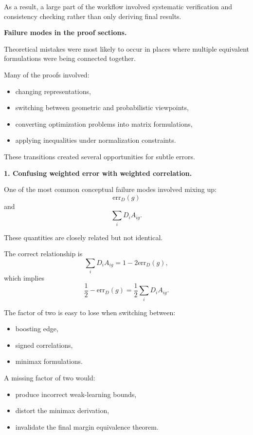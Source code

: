 \documentclass[11pt]{article}
\begin{document}
\begin{enumerate}
\begin{solutionbox}
As a result, a large part of the workflow involved systematic verification and consistency checking rather than only deriving final results.

\medskip

\textbf{Failure modes in the proof sections.}

Theoretical mistakes were most likely to occur in places where multiple equivalent formulations were being connected together.

Many of the proofs involved:
\begin{itemize}
    \item changing representations,
    \item switching between geometric and probabilistic viewpoints,
    \item converting optimization problems into matrix formulations,
    \item applying inequalities under normalization constraints.
\end{itemize}

These transitions created several opportunities for subtle errors.

\bigskip

\textbf{1. Confusing weighted error with weighted correlation.}

One of the most common conceptual failure modes involved mixing up:
\[
\mathrm{err}_D(g)
\]
and
\[
\sum_iD_iA_{ig}.
\]

These quantities are closely related but not identical.

The correct relationship is
\[
\sum_iD_iA_{ig}
=
1-2\mathrm{err}_D(g),
\]
which implies
\[
\frac12-\mathrm{err}_D(g)
=
\frac12
\sum_iD_iA_{ig}.
\]

The factor of two is easy to lose when switching between:
\begin{itemize}
    \item boosting edge,
    \item signed correlations,
    \item minimax formulations.
\end{itemize}

A missing factor of two would:
\begin{itemize}
    \item produce incorrect weak-learning bounds,
    \item distort the minimax derivation,
    \item invalidate the final margin equivalence theorem.
\end{itemize}


\end{solutionbox}
\end{enumerate}
\end{document}
